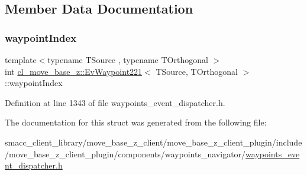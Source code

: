 \subsection{Member Data Documentation}
\mbox{\label{structcl__move__base__z_1_1EvWaypoint221_a9a0a9734a1c1fd1e2681e20e0eda4242}} 
\subsubsection{\texorpdfstring{waypoint\+Index}{waypointIndex}}
{\footnotesize\ttfamily template$<$typename T\+Source , typename T\+Orthogonal $>$ \\
int \hyperlink{structcl__move__base__z_1_1EvWaypoint221}{cl\+\_\+move\+\_\+base\+\_\+z\+::\+Ev\+Waypoint221}$<$ T\+Source, T\+Orthogonal $>$\+::waypoint\+Index}



Definition at line 1343 of file waypoints\+\_\+event\+\_\+dispatcher.\+h.



The documentation for this struct was generated from the following file\+:\begin{DoxyCompactItemize}
\item 
smacc\+\_\+client\+\_\+library/move\+\_\+base\+\_\+z\+\_\+client/move\+\_\+base\+\_\+z\+\_\+client\+\_\+plugin/include/move\+\_\+base\+\_\+z\+\_\+client\+\_\+plugin/components/waypoints\+\_\+navigator/\hyperlink{waypoints__event__dispatcher_8h}{waypoints\+\_\+event\+\_\+dispatcher.\+h}\end{DoxyCompactItemize}
